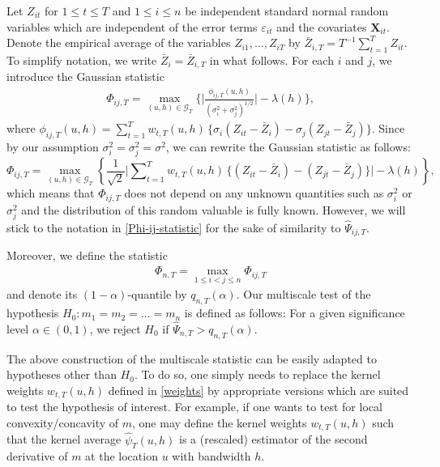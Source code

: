 \documentclass[a4paper,12pt]{article}
\begin{document}
Let $Z_{it}$ for $1 \le t \le T$ and $1 \le i \le n$ be independent standard normal random variables which are independent of the error terms $\varepsilon_{it}$ and the covariates $\mathbf{X}_{it}$. Denote the empirical average of the variables $Z_{i1},\ldots,Z_{iT}$ by $\bar{Z}_{i,T} = T^{-1} \sum_{t=1}^T Z_{it}$. To simplify notation, we write $\bar{Z}_i = \bar{Z}_{i,T}$ in what follows. For each $i$ and $j$, we introduce the Gaussian statistic 
\begin{align}\label{Phi-ij-statistic}
\Phi_{ij,T} = \max_{(u,h) \in \mathcal{G}_T} \Big\{ \Big|\frac{\phi_{ij,T}(u,h)}{(\sigma_i^2 + \sigma_j^2)^{1/2}}\Big| - \lambda(h) \Big\},
\end{align}
where $\phi_{ij,T}(u,h) = \sum\nolimits_{t=1}^T w_{t,T}(u,h) \, \big\{ \sigma_i (Z_{it} - \bar{Z}_i) - \sigma_j (Z_{jt} - \bar{Z}_j) \big\}$. Since by our assumption $\sigma_i^2 = \sigma^2_j = \sigma^2$, we can rewrite the Gaussian statistic as follows:
\[\Phi_{ij,T} = \max_{(u,h) \in \mathcal{G}_T} \left\{\frac{1}{\sqrt{2}} \Big|\sum\nolimits_{t=1}^T w_{t,T}(u,h) \, \big\{ (Z_{it} - \bar{Z}_i) - (Z_{jt} - \bar{Z}_j) \big\}\Big| - \lambda(h) \right\}, \] 
which means that $\Phi_{ij,T}$ does not depend on any unknown quantities such as $\sigma^2_i$ or $\sigma_j^2$ and the distribution of this random valuable is fully known. However, we will stick to the notation in \eqref{Phi-ij-statistic} for the sake of similarity to $\widehat{\Psi}_{ij,T}$.

Moreover, we define the statistic
\begin{align}\label{Phi-statistic}
\Phi_{n,T} = \max_{1 \le i < j \le n} \Phi_{ij,T}
\end{align}
and denote its $(1-\alpha)$-quantile by $q_{n,T}(\alpha)$. Our multiscale test of the hypothesis $H_0: m_1 = m_2 = \ldots = m_n$ is defined as follows: For a given significance level $\alpha \in (0,1)$, we reject $H_0$ if $\widehat{\Psi}_{n,T} > q_{n,T}(\alpha)$. 


\begin{remark}
The above construction of the multiscale statistic can be easily adapted to hypotheses other than $H_0$. To do so, one simply needs to replace the kernel weights $w_{t,T}(u,h)$ defined in \eqref{weights} by appropriate versions which are suited to test the hypothesis of interest. For example, if one wants to test for local convexity/concavity of $m$, one may define the kernel weights $w_{t,T}(u,h)$ such that the kernel average $\widehat{\psi}_T(u,h)$ is a (rescaled) estimator of the second derivative of $m$ at the location $u$ with bandwidth $h$. 
\end{remark}
\end{document}
